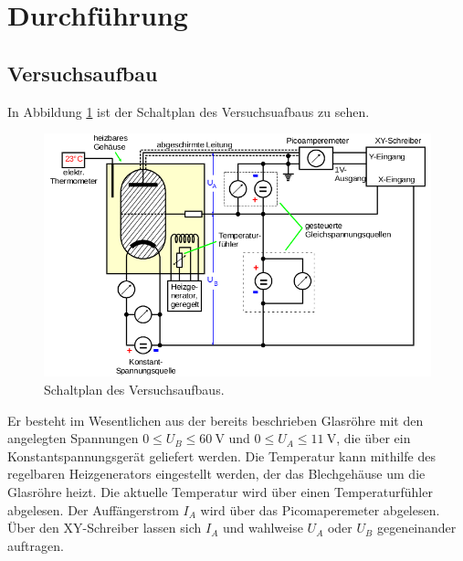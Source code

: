 \section{Durchführung}
\subsection{Versuchsaufbau}
In Abbildung \ref{fig:4} ist der Schaltplan des Versuchsuafbaus zu sehen.
\begin{figure}
  \centering
  \includegraphics[scale=0.5]{aufbau.png}
  \caption{Schaltplan des Versuchsaufbaus. \cite{anleitung}}
  \label{fig:4}
\end{figure}
Er besteht im Wesentlichen aus der bereits beschrieben Glasröhre mit den angelegten
Spannungen $0 \leq U_B \leq \SI{60}{\volt}$ und $0 \leq U_A \leq \SI{11}{\volt}$, die
über ein Konstantspannungsgerät geliefert werden.
Die Temperatur kann mithilfe des regelbaren Heizgenerators eingestellt werden,
der das Blechgehäuse um die Glasröhre heizt.
Die aktuelle
Temperatur wird über einen Temperaturfühler abgelesen. Der Auffängerstrom $I_A$ wird über das
Picomaperemeter abgelesen. Über den XY-Schreiber lassen sich $I_A$ und wahlweise $U_A$ oder
$U_B$ gegeneinander auftragen.

